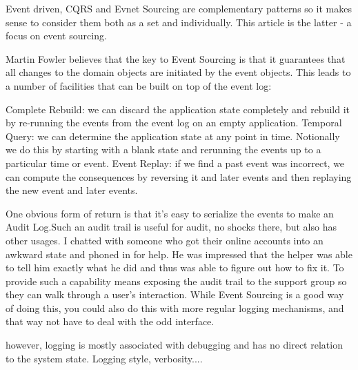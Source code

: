 Event driven, CQRS and Evnet Sourcing are complementary patterns so it makes sense to consider them both as a set and individually. This article is the latter - a focus on event sourcing.



Martin Fowler believes that the key to Event Sourcing is that it guarantees that all changes to the domain objects are initiated by the event objects. This leads to a number of facilities that can be built on top of the event log:

Complete Rebuild: we can discard the application state completely and rebuild it by re-running the events from the event log on an empty application.
Temporal Query: we can determine the application state at any point in time. Notionally we do this by starting with a blank state and rerunning the events up to a particular time or event.
Event Replay: if we find a past event was incorrect, we can compute the consequences by reversing it and later events and then replaying the new event and later events. %

One obvious form of return is that it's easy to serialize the events to make an Audit Log.Such an audit trail is useful for audit, no shocks there, but also has other usages. I chatted with someone who got their online accounts into an awkward state and phoned in for help. He was impressed that the helper was able to tell him exactly what he did and thus was able to figure out how to fix it. To provide such a capability means exposing the audit trail to the support group so they can walk through a user's interaction. While Event Sourcing is a good way of doing this, you could also do this with more regular logging mechanisms, and that way not have to deal with the odd interface. %

however, logging is mostly associated with debugging and has no direct relation to the system state. Logging style, verbosity....

